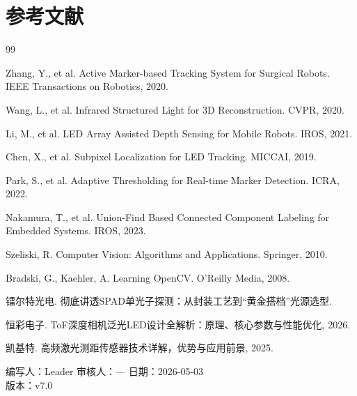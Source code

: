 \documentclass[12pt,a4paper]{article}
\begin{document}
\section*{参考文献}
\begin{thebibliography}{99}
\small
\item Zhang, Y., et al. Active Marker-based Tracking System for Surgical Robots. IEEE Transactions on Robotics, 2020.
\item Wang, L., et al. Infrared Structured Light for 3D Reconstruction. CVPR, 2020.
\item Li, M., et al. LED Array Assisted Depth Sensing for Mobile Robots. IROS, 2021.
\item Chen, X., et al. Subpixel Localization for LED Tracking. MICCAI, 2019.
\item Park, S., et al. Adaptive Thresholding for Real-time Marker Detection. ICRA, 2022.
\item Nakamura, T., et al. Union-Find Based Connected Component Labeling for Embedded Systems. IROS, 2023.
\item Szeliski, R. Computer Vision: Algorithms and Applications. Springer, 2010.
\item Bradski, G., Kaehler, A. Learning OpenCV. O'Reilly Media, 2008.
\item 镭尔特光电. 彻底讲透SPAD单光子探测：从封装工艺到``黄金搭档''光源选型.
\item 恒彩电子. ToF深度相机泛光LED设计全解析：原理、核心参数与性能优化, 2026.
\item 凯基特. 高频激光测距传感器技术详解，优势与应用前景, 2025.
\end{thebibliography}

\vfill
\begin{center}
编写人：Leader \hspace{2cm} 审核人：— \hspace{2cm} 日期：2026-05-03 \\
版本：v7.0
\end{center}
\end{document}
